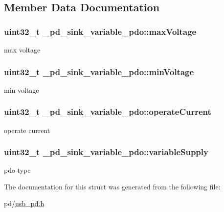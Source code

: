 \subsection{Member Data Documentation}
\hypertarget{struct__pd__sink__variable__pdo_adc5d6a90b282fc222e180b79aef74e65}{
\subsubsection[{max\-Voltage}]{\setlength{\rightskip}{0pt plus 5cm}uint32\-\_\-t \-\_\-pd\-\_\-sink\-\_\-variable\-\_\-pdo\-::max\-Voltage}}\label{struct__pd__sink__variable__pdo_adc5d6a90b282fc222e180b79aef74e65}
max voltage \hypertarget{struct__pd__sink__variable__pdo_a0ee666a778180c34bc4e0119ee3f51a3}{
\subsubsection[{min\-Voltage}]{\setlength{\rightskip}{0pt plus 5cm}uint32\-\_\-t \-\_\-pd\-\_\-sink\-\_\-variable\-\_\-pdo\-::min\-Voltage}}\label{struct__pd__sink__variable__pdo_a0ee666a778180c34bc4e0119ee3f51a3}
min voltage \hypertarget{struct__pd__sink__variable__pdo_a145ba35b4f033f771ae9b72c018181d5}{
\subsubsection[{operate\-Current}]{\setlength{\rightskip}{0pt plus 5cm}uint32\-\_\-t \-\_\-pd\-\_\-sink\-\_\-variable\-\_\-pdo\-::operate\-Current}}\label{struct__pd__sink__variable__pdo_a145ba35b4f033f771ae9b72c018181d5}
operate current \hypertarget{struct__pd__sink__variable__pdo_a8ed1cefb52db381deddc243bd7d702e3}{
\subsubsection[{variable\-Supply}]{\setlength{\rightskip}{0pt plus 5cm}uint32\-\_\-t \-\_\-pd\-\_\-sink\-\_\-variable\-\_\-pdo\-::variable\-Supply}}\label{struct__pd__sink__variable__pdo_a8ed1cefb52db381deddc243bd7d702e3}
pdo type 

The documentation for this struct was generated from the following file\-:\begin{DoxyCompactItemize}
\item 
pd/\hyperlink{usb__pd_8h}{usb\-\_\-pd.\-h}\end{DoxyCompactItemize}
